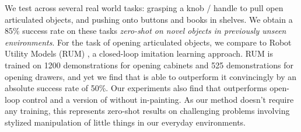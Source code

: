 We test \name across several real world tasks: grasping a knob / handle to pull 
open articulated objects, and pushing onto buttons and books in shelves. We obtain a 85\% success 
rate on these tasks \textit{zero-shot on novel objects in previously unseen environments}. 
For the task of opening articulated objects, we compare to Robot Utility Models (RUM) \cite{etukuru2024robot},
a closed-loop imitation learning approach. RUM is trained on 1200 demonstrations for opening cabinets and 525 demonstrations
for opening drawers, and yet we find that \name is able to outperform it convincingly by an absolute success rate of 50\%.
Our experiments also find that \name
outperforms open-loop control and a version of \name without in-painting.
As our method doesn't require any training, this represents zero-shot results
on challenging problems involving stylized manipulation of little things in our everyday environments.

